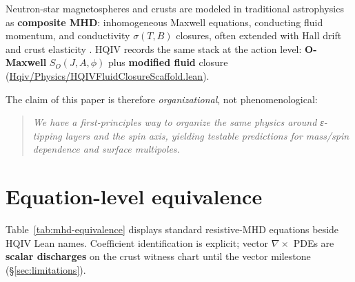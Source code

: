 \documentclass[11pt,notitlepage]{amsart}
\newcommand{\leanrepo}{https://github.com/HQIV/hqiv-lean/blob/main}
\newcommand{\leanfile}[1]{\href{\leanrepo/#1}{\footnotesize\url{#1}}}
\begin{document}
Neutron-star magnetospheres and crusts are modeled in traditional astrophysics as
\textbf{composite MHD}: inhomogeneous Maxwell equations, conducting fluid momentum,
and conductivity $\sigma(T,B)$ closures, often extended with Hall drift and crust
elasticity \cite{hqiv-compact-object-witness-data}.
HQIV records the same stack at the action level: \textbf{O-Maxwell} $S_O(J,A,\phi)$
plus \textbf{modified fluid} closure (\leanfile{Hqiv/Physics/HQIVFluidClosureScaffold.lean}).

The claim of this paper is therefore \emph{organizational}, not phenomenological:
\begin{quote}
\emph{We have a first-principles way to organize the same physics around
ε-tipping layers and the spin axis, yielding testable predictions for mass/spin
dependence and surface multipoles.}
\end{quote}

\section{Equation-level equivalence}
\label{sec:equivalence}

Table~\ref{tab:mhd-equivalence} displays standard resistive-MHD equations beside
HQIV Lean names. Coefficient identification is explicit; vector $\nabla\times$ PDEs
are \textbf{scalar discharges} on the crust witness chart until the vector milestone
(\S\ref{sec:limitations}).
\end{document}
